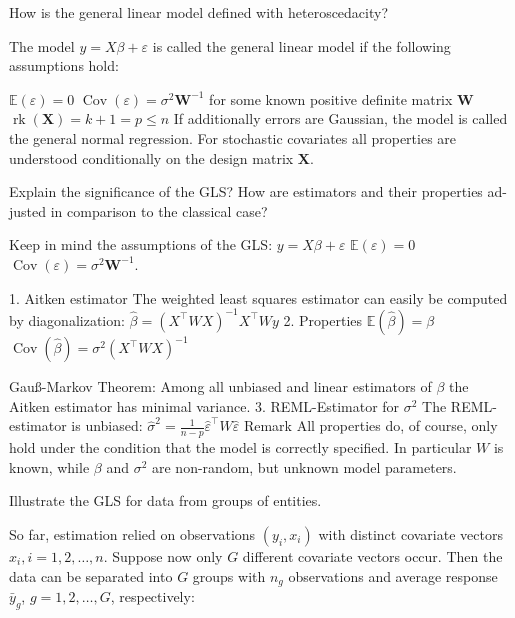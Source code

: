 How is the general linear model defined with heteroscedacity?


The model \( y = X \beta + \varepsilon \) 
is called the general linear model if the following assumptions hold:

\( \mathbb{E}(\varepsilon) = 0 \)
\( \operatorname{Cov}(\varepsilon) = \sigma^2 \mathbf{W}^{-1} \)
for some known positive definite matrix \( \mathbf{W} \) 
\( \operatorname{rk} \left( \mathbf{X} \right) = k + 1 = p \leq n \)
If additionally errors are Gaussian, the model is called the general normal regression.
For stochastic covariates all properties are understood conditionally on the design matrix \(\mathbf{X} \).


Explain the significance of the GLS? How are estimators and their properties ad-
justed in comparison to the classical case?

Keep in mind the assumptions of the GLS:
\( y = X \beta + \varepsilon \)
\( \mathbb{E}(\varepsilon) = 0 \)
\( \operatorname{Cov}(\varepsilon) = \sigma^2 \mathbf{W}^{-1} \).


1. Aitken estimator
The weighted least squares estimator can easily be computed by diagonalization:
\( \hat{\beta} = (X^{\top}WX)^{-1}X^{\top}Wy \) 
2. Properties
\( \mathbb{E}(\hat{\beta}) = \beta \)
\( \operatorname{Cov}(\hat{\beta}) = \sigma^2 (X^{\top}WX)^{-1} \)

Gauß-Markov Theorem:
Among all unbiased and linear estimators of \( \beta \) the Aitken estimator has minimal variance.
3. REML-Estimator for \( \sigma^2 \)
The REML-estimator is unbiased:
\( \hat{\sigma}^2 = \frac{1}{n - p} \hat{\varepsilon}^{\top} W \hat{\varepsilon} \)
Remark
All properties do, of course, only hold under the condition that the model is correctly specified.
In particular \(W\) is known, while \( \beta \) and \( \sigma^2 \) are non-random, but unknown model parameters.



Illustrate the GLS for data from groups of entities.

So far, estimation relied on observations \((y_i, x_i)\) with distinct covariate vectors \(x_i, i = 1, 2, \dots, n\).
Suppose now only \( G \) different covariate vectors occur. Then the data can be separated into \( G \) groups with \( n_g \) observations 
and average response \( \bar{y}_g \), \( g = 1, 2, \dots, G \), respectively:

